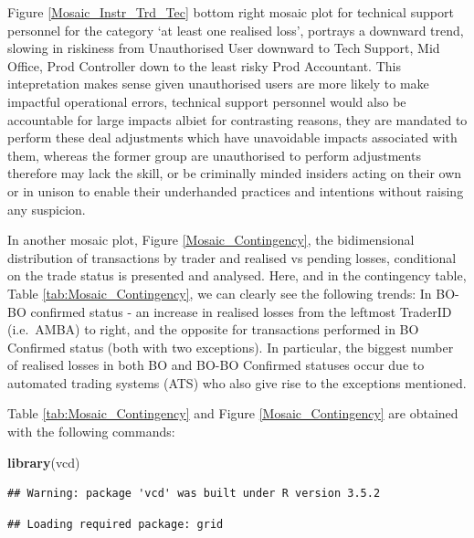 \documentclass[]{article}
\newenvironment{Shaded}{\begin{snugshade}}{\end{snugshade}}
\newcommand{\KeywordTok}[1]{\textcolor[rgb]{0.13,0.29,0.53}{\textbf{#1}}}
\newcommand{\NormalTok}[1]{#1}
\begin{document}
Figure \ref{Mosaic_Instr_Trd_Tec} bottom right mosaic plot for technical
support personnel for the category `at least one realised loss',
portrays a downward trend, slowing in riskiness from Unauthorised User
downward to Tech Support, Mid Office, Prod Controller down to the least
risky Prod Accountant. This intepretation makes sense given unauthorised
users are more likely to make impactful operational errors, technical
support personnel would also be accountable for large impacts albiet for
contrasting reasons, they are mandated to perform these deal adjustments
which have unavoidable impacts associated with them, whereas the former
group are unauthorised to perform adjustments therefore may lack the
skill, or be criminally minded insiders acting on their own or in unison
to enable their underhanded practices and intentions without raising any
suspicion.\medskip   

In another mosaic plot, Figure \ref{Mosaic_Contingency}, the
bidimensional distribution of transactions by trader and realised vs
pending losses, conditional on the trade status is presented and
analysed. Here, and in the contingency table, Table
\ref{tab:Mosaic_Contingency}, we can clearly see the following trends:
In BO-BO confirmed status - an increase in realised losses from the
leftmost TraderID (i.e.~AMBA) to right, and the opposite for
transactions performed in BO Confirmed status (both with two
exceptions). In particular, the biggest number of realised losses in
both BO and BO-BO Confirmed statuses occur due to automated trading
systems (ATS) who also give rise to the exceptions mentioned.\medskip

Table \ref{tab:Mosaic_Contingency} and Figure \ref{Mosaic_Contingency}
are obtained with the following commands:

\singlespacing

\begin{Shaded}
\begin{Highlighting}[]
\KeywordTok{library}\NormalTok{(vcd)}
\end{Highlighting}
\end{Shaded}

\begin{verbatim}
## Warning: package 'vcd' was built under R version 3.5.2
\end{verbatim}

\begin{verbatim}
## Loading required package: grid
\end{verbatim}
\end{document}
